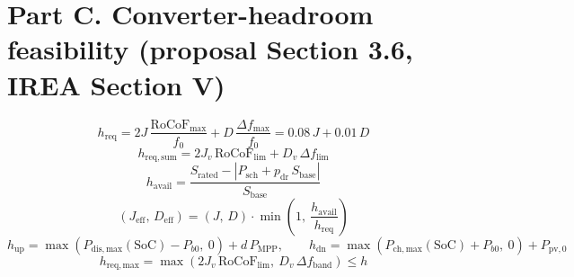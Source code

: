 \documentclass[11pt]{article}
\begin{document}
\section*{Part C. Converter-headroom feasibility (proposal Section 3.6, IREA Section V)}
\begin{equation}
h_{\mathrm{req}} = 2J\,\frac{\mathrm{RoCoF}_{\max}}{f_0} + D\,\frac{\Delta f_{\max}}{f_0} = 0.08\,J + 0.01\,D \tag{3.17}
\end{equation}
\begin{equation}
h_{\mathrm{req,sum}} = 2J_v\,\mathrm{RoCoF}_{\mathrm{lim}} + D_v\,\Delta f_{\mathrm{lim}} \tag{IREA 7}
\end{equation}
\begin{equation}
h_{\mathrm{avail}} = \frac{S_{\mathrm{rated}} - \left|P_{\mathrm{sch}} + p_{\mathrm{dr}}\,S_{\mathrm{base}}\right|}{S_{\mathrm{base}}} \tag{3.18}
\end{equation}
\begin{equation}
\left(J_{\mathrm{eff}},\,D_{\mathrm{eff}}\right) = \left(J,\,D\right)\cdot\min\!\left(1,\ \frac{h_{\mathrm{avail}}}{h_{\mathrm{req}}}\right) \tag{3.19}
\end{equation}
\begin{equation}
h_{\mathrm{up}} = \max\!\left(P_{\mathrm{dis,max}}(\mathrm{SoC}) - P_{b0},\ 0\right) + d\,P_{\mathrm{MPP}}, \qquad h_{\mathrm{dn}} = \max\!\left(P_{\mathrm{ch,max}}(\mathrm{SoC}) + P_{b0},\ 0\right) + P_{\mathrm{pv},0} \tag{3.20}
\end{equation}
\begin{equation}
h_{\mathrm{req,max}} = \max\!\left(2J_v\,\mathrm{RoCoF}_{\mathrm{lim}},\ D_v\,\Delta f_{\mathrm{band}}\right) \le h \tag{3.21}
\end{equation}
\end{document}
